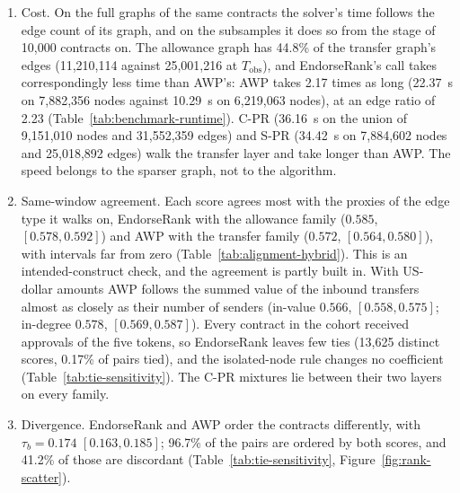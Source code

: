 \begin{enumerate}
\item[C1.] Cost. On the full graphs of the same contracts the solver's time follows the edge count of its graph, and on the subsamples it does so from the stage of 10{,}000 contracts on. The allowance graph has 44.8\% of the transfer graph's edges (11,210,114 against 25,001,216 at $T_{\mathrm{obs}}$), and EndorseRank's call takes correspondingly less time than AWP's: AWP takes 2.17 times as long (22.37~s on 7,882,356 nodes against 10.29~s on 6,219,063 nodes), at an edge ratio of 2.23 (Table~\ref{tab:benchmark-runtime}). C-PR (36.16~s on the union of 9,151,010 nodes and 31,552,359 edges) and S-PR (34.42~s on 7,884,602 nodes and 25,018,892 edges) walk the transfer layer and take longer than AWP. The speed belongs to the sparser graph, not to the algorithm.
\item[C2.] Same-window agreement. Each score agrees most with the proxies of the edge type it walks on, EndorseRank with the allowance family ($0.585$, $[0.578,0.592]$) and AWP with the transfer family ($0.572$, $[0.564,0.580]$), with intervals far from zero (Table~\ref{tab:alignment-hybrid}). This is an intended-construct check, and the agreement is partly built in. With US-dollar amounts AWP follows the summed value of the inbound transfers almost as closely as their number of senders (in-value $0.566$, $[0.558,0.575]$; in-degree $0.578$, $[0.569,0.587]$). Every contract in the cohort received approvals of the five tokens, so EndorseRank leaves few ties (13,625 distinct scores, 0.17\% of pairs tied), and the isolated-node rule changes no coefficient (Table~\ref{tab:tie-sensitivity}). The C-PR mixtures lie between their two layers on every family.
\item[C3.] Divergence. EndorseRank and AWP order the contracts differently, with $\tau_b=0.174$ $[0.163,0.185]$; 96.7\% of the pairs are ordered by both scores, and 41.2\% of those are discordant (Table~\ref{tab:tie-sensitivity}, Figure~\ref{fig:rank-scatter}).

\end{enumerate}
